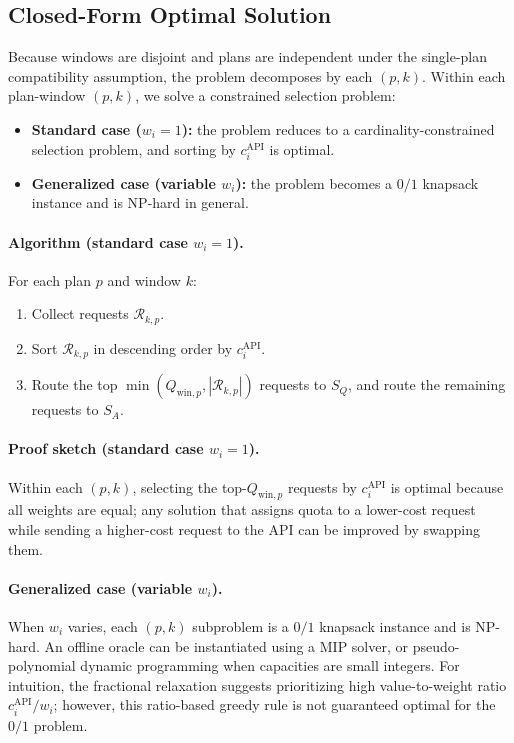 \documentclass[11pt]{article}
\begin{document}
\subsection{Closed-Form Optimal Solution}
Because windows are disjoint and plans are independent under the single-plan compatibility assumption, the problem decomposes by each \((p,k)\).
Within each plan-window \((p,k)\), we solve a constrained selection problem:
\begin{itemize}
  \item \textbf{Standard case (\(w_i=1\)):} the problem reduces to a cardinality-constrained selection problem, and sorting by \(c_i^{\text{API}}\) is optimal.
  \item \textbf{Generalized case (variable \(w_i\)):} the problem becomes a \(0/1\) knapsack instance and is NP-hard in general.
\end{itemize}

\paragraph{Algorithm (standard case \(w_i=1\)).}
For each plan \(p\) and window \(k\):
\begin{enumerate}
  \item Collect requests \(\mathcal{R}_{k,p}\).
  \item Sort \(\mathcal{R}_{k,p}\) in descending order by \(c_i^{\text{API}}\).
  \item Route the top \(\min(Q_{\text{win},p}, |\mathcal{R}_{k,p}|)\) requests to \(S_Q\), and route the remaining requests to \(S_A\).
\end{enumerate}

\paragraph{Proof sketch (standard case \(w_i=1\)).}
Within each \((p,k)\), selecting the top-\(Q_{\text{win},p}\) requests by \(c_i^{\text{API}}\) is optimal because all weights are equal; any solution that assigns quota to a lower-cost request while sending a higher-cost request to the API can be improved by swapping them.

\paragraph{Generalized case (variable \(w_i\)).}
When \(w_i\) varies, each \((p,k)\) subproblem is a \(0/1\) knapsack instance and is NP-hard.
An offline oracle can be instantiated using a MIP solver, or pseudo-polynomial dynamic programming when capacities are small integers.
For intuition, the fractional relaxation suggests prioritizing high value-to-weight ratio \(c_i^{\text{API}}/w_i\); however, this ratio-based greedy rule is not guaranteed optimal for the \(0/1\) problem.
\end{document}

